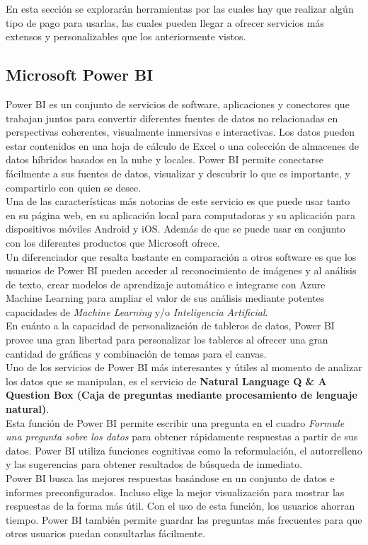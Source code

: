 En esta sección se explorarán herramientas por las cuales hay que realizar algún tipo de pago para usarlas, las cuales pueden llegar a ofrecer servicios más extensos y personalizables que los anteriormente vistos.


\subsection{Microsoft Power BI}
Power BI es un conjunto de servicios de software, aplicaciones y conectores que trabajan juntos para convertir diferentes fuentes de datos no relacionadas en perspectivas coherentes, visualmente inmersivas e interactivas. Los datos pueden estar contenidos en una hoja de cálculo de Excel o una colección de almacenes de datos híbridos basados en la nube y locales. Power BI  permite conectarse fácilmente a sus fuentes de datos, visualizar y descubrir lo que es importante, y compartirlo con quien se desee.\\

Una de las características más notorias de este servicio es que puede usar tanto en su página web, en su aplicación local para computadoras y su aplicación para dispositivos móviles Android y iOS. Además de que se puede usar en conjunto con los diferentes productos que Microsoft ofrece.\\
Un diferenciador que resalta bastante en comparación a otros software es que los usuarios de Power BI  pueden acceder al reconocimiento de imágenes y al análisis de texto, crear modelos de aprendizaje automático e integrarse con Azure Machine Learning para ampliar el valor de sus análisis mediante potentes capacidades de \textit{Machine Learning} y/o \textit{Inteligencia Artificial}.\\

En cuánto a la capacidad de personalización de tableros de datos, Power BI provee una gran libertad para personalizar los tableros al ofrecer una gran cantidad de gráficas y combinación de temas para el canvas.\\

Uno de los servicios de Power BI más interesantes y útiles al momento de analizar los datos que se manipulan, es el servicio de \textbf{Natural Language Q \& A Question Box (Caja de preguntas mediante procesamiento de lenguaje natural)}.\\
Esta función de Power BI permite escribir una pregunta en el cuadro \textit{Formule una pregunta sobre los datos} para obtener rápidamente respuestas a partir de sus datos. Power BI utiliza funciones cognitivas como la reformulación, el autorrelleno y las sugerencias para obtener resultados de búsqueda de inmediato.\\
Power BI busca las mejores respuestas basándose en un conjunto de datos e informes preconfigurados. Incluso elige la mejor visualización para mostrar las respuestas de la forma más útil.
Con el uso de esta función, los usuarios ahorran tiempo. Power BI también  permite guardar las preguntas más frecuentes para que otros usuarios puedan consultarlas fácilmente.

